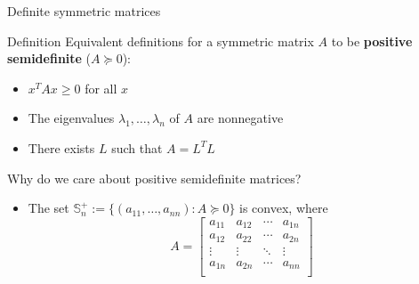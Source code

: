 \documentclass[aspectratio=169]{beamer}
\begin{document}
\begin{frame}{Definite symmetric matrices}
\begin{block}{Definition}
Equivalent definitions for a symmetric matrix $A$ to be \textbf{positive semidefinite} ($A \succeq 0$):
\begin{itemize}
\item
$x^T A x \geq 0$ for all $x$
\item
The eigenvalues $\lambda_1, \ldots, \lambda_n$ of $A$ are nonnegative
\item
There exists $L$ such that $A = L^T L$
\end{itemize}
\end{block}
\pause
Why do we care about positive semidefinite matrices?
\begin{itemize}
\item
The set $\mathbb S_n^+ := \{ (a_{11},\dots, a_{nn}) : A \succeq 0 \}$ is convex, where
$$
A = \begin{bmatrix}
a_{11} & a_{12} & \cdots & a_{1n} \\
a_{12} & a_{22} & \cdots & a_{2n} \\
\vdots & \vdots & \ddots & \vdots \\
a_{1n} & a_{2n} & \cdots & a_{nn} \\
\end{bmatrix}
$$
\end{itemize}
\end{frame}
\end{document}

